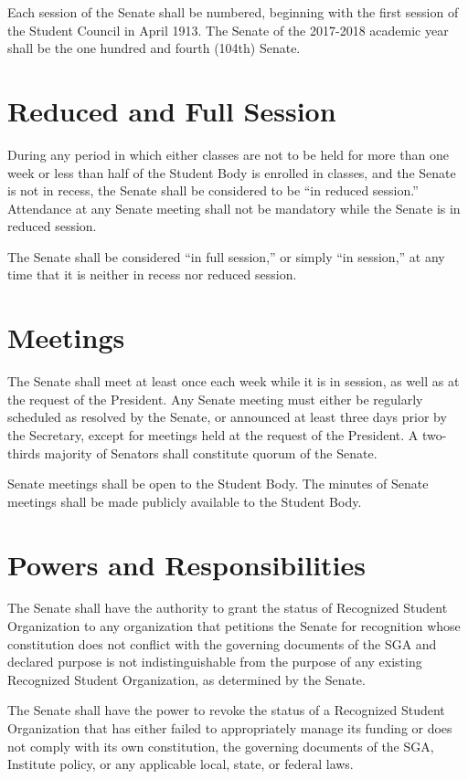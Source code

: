 \documentclass[12pt,oneside]{scrreprt}
\begin{document}
Each session of the Senate shall be numbered, beginning with the first session of the Student Council in April 1913. The Senate of the 2017-2018 academic year shall be the one hundred and fourth (104th) Senate.

\section{Reduced and Full Session}
During any period in which either classes are not to be held for more than one week or less than half of the Student Body is enrolled in classes, and the Senate is not in recess, the Senate shall be considered to be ``in reduced session.'' Attendance at any Senate meeting shall not be mandatory while the Senate is in reduced session.

The Senate shall be considered ``in full session,'' or simply ``in session,'' at any time that it is neither in recess nor reduced session.

\section{Meetings}
The Senate shall meet at least once each week while it is in session, as well as at the request of the President. Any Senate meeting must either be regularly scheduled as resolved by the Senate, or announced at least three days prior by the Secretary, except for meetings held at the request of the President. A two-thirds majority of Senators shall constitute quorum of the Senate.

Senate meetings shall be open to the Student Body. The minutes of Senate meetings shall be made publicly available to the Student Body.

\section{Powers and Responsibilities}
The Senate shall have the authority to grant the status of Recognized Student Organization to any organization that petitions the Senate for recognition whose constitution does not conflict with the governing documents of the SGA and declared purpose is not indistinguishable from the purpose of any existing Recognized Student Organization, as determined by the Senate.

The Senate shall have the power to revoke the status of a Recognized Student Organization that has either failed to appropriately manage its funding or does not comply with its own constitution, the governing documents of the SGA, Institute policy, or any applicable local, state, or federal laws. 
\end{document}
